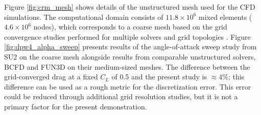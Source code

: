 Figure \ref{fig:crm_mesh} shows details of the unstructured mesh used for the CFD simulations.
The computational domain consists of $11.8\times10^6$ mixed elements ($4.6\times10^6$ nodes), which corresponds to a coarse mesh based on the grid convergence studies performed for multiple solvers and grid topologies \cite{vassberg_summary_2010}.
Figure \ref{fig:dpw4_alpha_sweep} presents results of the angle-of-attack sweep study from SU2 on the coarse mesh alongside results from comparable unstructured solvers, BCFD \cite{winkler_dorgan_cary_mani_2009} and FUN3D \cite{lee-rausch_application_2014} on their medium-sized meshes.
The difference between the grid-converged drag at a fixed $C_L$ of 0.5 and the present study is $\approx4\%$; this difference can be used as a rough metric for the discretization error.
This error could be reduced through additional grid resolution studies, but it is not a primary factor for the present demonstration.

